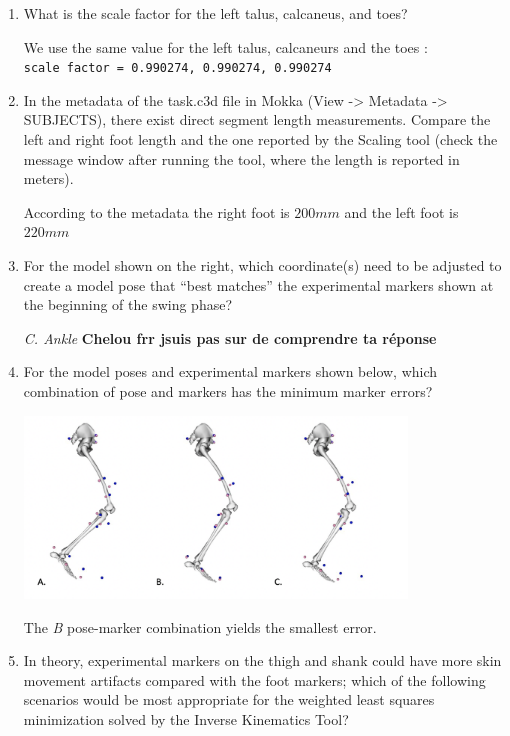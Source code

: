 \documentclass[11pt]{article}
\begin{document}
\begin{enumerate}
    \item What is the scale factor for the left talus, calcaneus, and toes?
    \begin{adjustwidth}{0.5cm}{}
        We use the same value for the left talus, calcaneurs and the toes : \\
        \texttt{scale factor =  0.990274, 0.990274, 0.990274}
    \end{adjustwidth}
    \item In the metadata of the task.c3d file in Mokka (View -> Metadata -> SUBJECTS), there exist direct segment length measurements. Compare the left and right foot length and the one reported by the Scaling tool (check the message window after running the tool, where the length is reported in meters).
    \begin{adjustwidth}{0.5cm}{}
        According to the metadata the right foot is $200mm$ and the left foot is $220mm$
    \end{adjustwidth}
    \item For the model shown on the right, which coordinate(s) need to be adjusted to create a model pose that “best matches” the experimental markers shown at the beginning of the swing phase?
    \begin{adjustwidth}{0.5cm}{}
        \textit{C.	Ankle} \textbf{Chelou frr jsuis pas sur de comprendre ta réponse}
    \end{adjustwidth} 
    \item For the model poses and experimental markers shown below, which combination of pose and markers has the minimum marker errors?
    \begin{adjustwidth}{0.5cm}{}
        \begin{center}
            \includegraphics[width=0.8\textwidth]{screens/min_pose_error.png}
        \end{center}
        The \textit{B} pose-marker combination yields the smallest error.
    \end{adjustwidth}
    \item In theory, experimental markers on the thigh and shank could have more skin movement artifacts compared with the foot markers; which of the following scenarios would be most appropriate for the weighted least squares minimization solved by the Inverse Kinematics Tool?

\end{enumerate}
\end{document}
